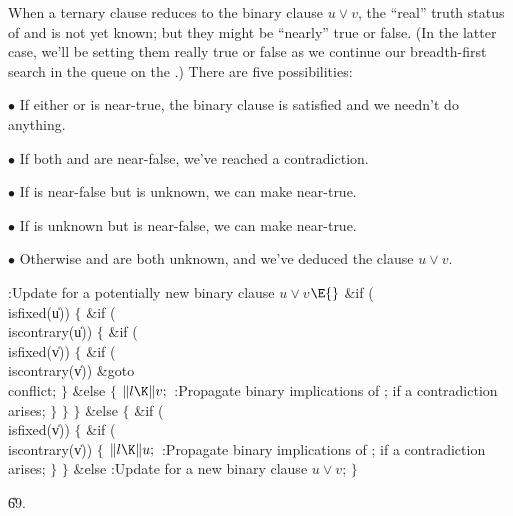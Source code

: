 When a ternary clause reduces to the binary clause $u\lor v$,
the ``real'' truth status of  and  is not yet known; but they
might be ``nearly'' true or false. (In the latter case, we'll be
setting them really true or false as we continue our
breadth-first search in the queue on the .) There are
five possibilities:
\smallskip
\item{$\bullet$}
If either  or  is near-true, the binary clause is satisfied
and we needn't do anything.
\smallskip
\item{$\bullet$}
If both  and  are near-false, we've reached a contradiction.
\smallskip
\item{$\bullet$}
If  is near-false but  is unknown, we can make 
near-true.
\smallskip
\item{$\bullet$}
If  is unknown but  is near-false, we can make 
near-true.
\smallskip
\item{$\bullet$}
Otherwise  and  are both unknown, and we've deduced the clause
$u\lor v$.

\Y\B\4:Update for a potentially new binary clause $u\lor v$\X${}\E{}$\6
\&{if} (\\{isfixed}(\|u))\5
${}\{{}$\1\6
\&{if} (\\{iscontrary}(\|u))\5
${}\{{}$\1\6
\&{if} (\\{isfixed}(\|v))\5
${}\{{}$\1\6
\&{if} (\\{iscontrary}(\|v))\1\5
\&{goto} \\{conflict};\2\6
\4${}\}{}$\5
\2\&{else}\5
${}\{{}$\1\6
${}\|l\K\|v;{}$\6
:Propagate binary implications of ;  if a
contradiction arises\X;\6
\4${}\}{}$\2\6
\4${}\}{}$\2\6
\4${}\}{}$\5
\2\&{else}\5
${}\{{}$\1\6
\&{if} (\\{isfixed}(\|v))\5
${}\{{}$\1\6
\&{if} (\\{iscontrary}(\|v))\5
${}\{{}$\1\6
${}\|l\K\|u;{}$\6
:Propagate binary implications of ;  if a
contradiction arises\X;\6
\4${}\}{}$\2\6
\4${}\}{}$\5
\2\&{else}\1\5
:Update for a new binary clause $u\lor v$\X;\2\6
\4${}\}{}$\2\par
\U69.\fi

